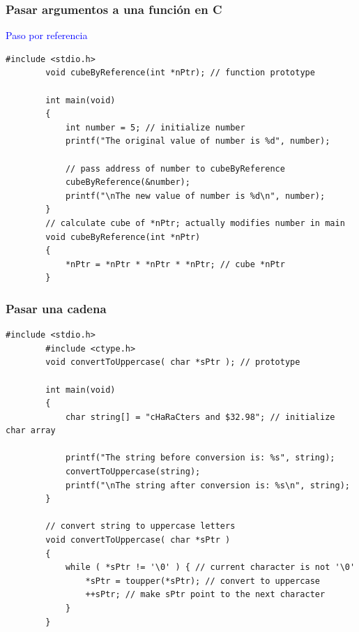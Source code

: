 \documentclass[10.5pt,scale=1.0,t,aspectratio=169,hyperref={pdfpagelabels=false}]{beamer}
\begin{document}
\begin{frame}[fragile]
	\frametitle{Pasar argumentos a una función en C} 
	\textcolor{blue}{Paso por referencia}
	\begin{lstlisting}[style=CStyle]
		#include <stdio.h>
		void cubeByReference(int *nPtr); // function prototype
		
		int main(void)
		{
			int number = 5; // initialize number
			printf("The original value of number is %d", number);
			
			// pass address of number to cubeByReference
			cubeByReference(&number);
			printf("\nThe new value of number is %d\n", number);
		}
		// calculate cube of *nPtr; actually modifies number in main
		void cubeByReference(int *nPtr)
		{
			*nPtr = *nPtr * *nPtr * *nPtr; // cube *nPtr
		}
	\end{lstlisting}
\end{frame}


\begin{frame}[fragile]
	\frametitle{Pasar una cadena}
	\begin{lstlisting}[style=CStyle]
		#include <stdio.h>
		#include <ctype.h>
		void convertToUppercase( char *sPtr ); // prototype
		
		int main(void)
		{
			char string[] = "cHaRaCters and $32.98"; // initialize char array
			
			printf("The string before conversion is: %s", string);
			convertToUppercase(string);
			printf("\nThe string after conversion is: %s\n", string);
		}
		
		// convert string to uppercase letters
		void convertToUppercase( char *sPtr )
		{
			while ( *sPtr != '\0' ) { // current character is not '\0'
				*sPtr = toupper(*sPtr); // convert to uppercase
				++sPtr; // make sPtr point to the next character
			}
		}
	\end{lstlisting}
\end{frame}
\end{document}
